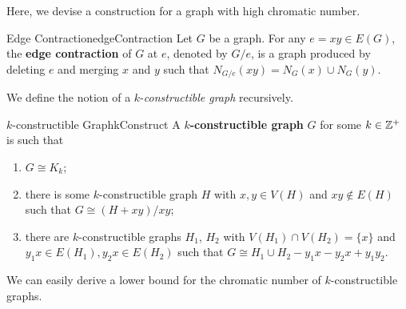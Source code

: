 \documentclass[math]{amznotes}
\theoremstyle{remark}
\newcommand{\0}{\mathbf{0}}
\newcommand{\1}{\mathbf{1}}
\begin{document}
Here, we devise a construction for a graph with high chromatic number.
\begin{dfnbox}{Edge Contraction}{edgeContraction}
    Let $G$ be a graph. For any $e = xy \in E(G)$, the {\color{red} \textbf{edge contraction}} of $G$ at $e$, denoted by $G/e$, is a graph produced by deleting $e$ and merging $x$ and $y$ such that $N_{G/e}(xy) = N_G(x) \cup N_G(y)$.
\end{dfnbox}
We define the notion of a $k$-\textit{constructible graph} recursively.
\begin{dfnbox}{$k$-constructible Graph}{kConstruct}
    A {\color{red} \textbf{$k$-constructible graph}} $G$ for some $k \in \mathbb{Z}^+$ is such that 
    \begin{enumerate}
        \item $G \cong K_k$;
        \item there is some $k$-constructible graph $H$ with $x, y \in V(H)$ and $xy \notin E(H)$ such that $G \cong (H + xy)/xy$;
        \item there are $k$-constructible graphs $H_1$, $H_2$ with $V(H_1) \cap V(H_2) = \{x\}$ and $y_1x \in E(H_1), y_2x \in E(H_2)$ such that $G \cong H_1 \cup H_2 - y_1x - y_2x + y_1y_2$.
    \end{enumerate}
\end{dfnbox}
We can easily derive a lower bound for the chromatic number of $k$-constructible graphs.
\end{document}
